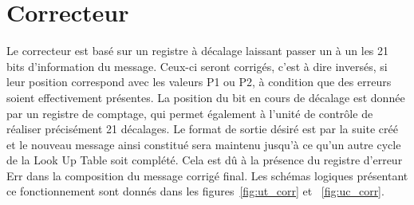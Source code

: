 \documentclass[a4paper, 11pt, svgnames]{report}
\begin{document}
        \section{Correcteur}
            Le correcteur est basé sur un registre à décalage laissant passer
            un à un les 21 bits d'information du message. Ceux-ci seront
            corrigés, c'est à dire inversés, si leur position correspond avec
            les valeurs P1 ou P2, à condition que des erreurs soient
            effectivement présentes. La position du bit en cours de décalage
            est donnée par un registre de comptage, qui permet également à
            l'unité de contrôle de réaliser précisément 21 décalages. Le format
            de sortie désiré est par la suite créé et le nouveau message ainsi
            constitué sera maintenu jusqu'à ce qu'un autre cycle de la Look Up
            Table soit complété. Cela est dû à la présence du registre d'erreur
            Err dans la composition du message corrigé final. Les schémas logiques
            présentant ce fonctionnement sont donnés dans 
            les figures~\ref{fig:ut_corr} et ~\ref{fig:uc_corr}.
\end{document}

